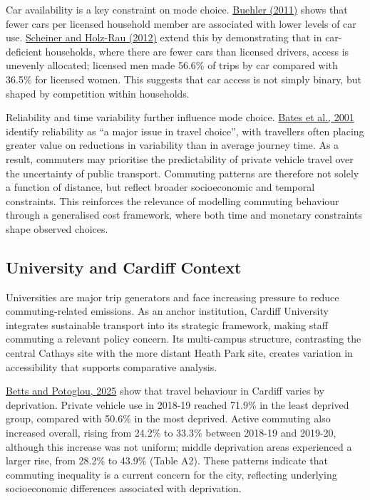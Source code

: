 \documentclass[11pt,a4paper]{article}
\newcommand{\hcite}[2]{\hyperlink{#1}{#2}}
\newcommand{\hcite}[2]{\hyperlink{#1}{#2}}
\begin{document}
Car availability is a key constraint on mode choice. \hcite{buehler2011}{Buehler (2011)} shows that fewer cars per licensed household member are associated with lower levels of car use. \hcite{scheiner2012}{Scheiner and Holz-Rau (2012)} extend this by demonstrating that in car-deficient households, where there are fewer cars than licensed drivers, access is unevenly allocated; licensed men made 56.6\% of trips by car compared with 36.5\% for licensed women. This suggests that car access is not simply binary, but shaped by competition within households.

Reliability and time variability further influence mode choice. \hcite{bates2001}{Bates et al., 2001} identify reliability as ``a major issue in travel choice'', with travellers often placing greater value on reductions in variability than in average journey time. As a result, commuters may prioritise the predictability of private vehicle travel over the uncertainty of public transport. Commuting patterns are therefore not solely a function of distance, but reflect broader socioeconomic and temporal constraints. This reinforces the relevance of modelling commuting behaviour through a generalised cost framework, where both time and monetary constraints shape observed choices.

\subsection{University and Cardiff Context}

Universities are major trip generators and face increasing pressure to reduce commuting-related emissions. As an anchor institution, Cardiff University integrates sustainable transport into its strategic framework, making staff commuting a relevant policy concern. Its multi-campus structure, contrasting the central Cathays site with the more distant Heath Park site, creates variation in accessibility that supports comparative analysis.

\hcite{betts2025}{Betts and Potoglou, 2025} show that travel behaviour in Cardiff varies by deprivation. Private vehicle use in 2018-19 reached 71.9\% in the least deprived group, compared with 50.6\% in the most deprived. Active commuting also increased overall, rising from 24.2\% to 33.3\% between 2018-19 and 2019-20, although this increase was not uniform; middle deprivation areas experienced a larger rise, from 28.2\% to 43.9\% (Table A2). These patterns indicate that commuting inequality is a current concern for the city, reflecting underlying socioeconomic differences associated with deprivation.
\end{document}
